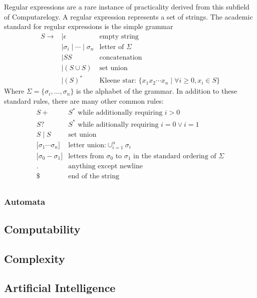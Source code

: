 \documentclass{article}
\begin{document}
	Regular expressions are a rare instance of practicality derived from this subfield of Computarelogy. A regular expression represents a set of strings. The academic standard for regular expressions is the simple grammar
	\[ \begin{array}{rll}
		S \rightarrow
			&\mid \epsilon & \text{empty string} \\
			&\mid \sigma_i \mid \cdots \mid \sigma_n & \text{letter of $\Sigma$} \\
			&\mid SS & \text{concatenation} \\
			&\mid (S \cup S) & \text{set union} \\
			&\mid (S)^* & \text{Kleene star: } \{ x_1 x_2 \cdots x_n \mid \forall i \geq 0, x_i \in S \}
	\end{array} \]
	Where $\Sigma = \{ \sigma_i, \dots, \sigma_n \}$ is the alphabet of the grammar. In addition to these standard rules, there are many other common rules:
	\[ \begin{array}{r|l}
		S+ 			&S^* \text{ while additionally requiring } i > 0 \\
		S?			&S^* \text{ while aditionally requiring } i = 0 \lor i = 1 \\
		S \mid S 	&\text{set union} \\
		\text{[} \sigma_1 \cdots \sigma_n \text{]}
					&\text{letter union:} \cup_{i=1}^n \sigma_i \\
		\text{[} \sigma_0-\sigma_1 \text{]}
					&\text{letters from $\sigma_0$ to $\sigma_1$ in the standard ordering of $\Sigma$} \\
		. 			&\text{anything except newline} \\
		\$ 			&\text{end of the string} \\
		
		
	\end{array} \]

\subsubsection{Automata}

\subsection{Computability}

\subsection{Complexity}

\subsection{Artificial Intelligence}
\end{document}
